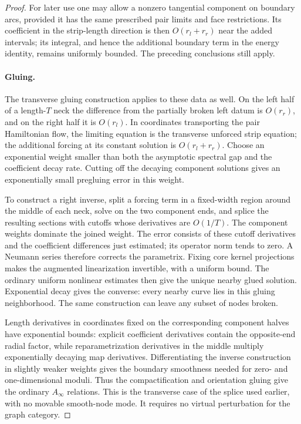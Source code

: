 \documentclass[11pt]{article}
\theoremstyle{definition}
\theoremstyle{remark}
\numberwithin{equation}{section}
\begin{document}
\begin{proof}
For later use one may allow a nonzero tangential component on boundary
arcs, provided it has the same prescribed pair limits and face
restrictions.  Its coefficient in the strip-length direction is then
\(O(r_l+r_r)\) near the added intervals; its integral, and hence the
additional boundary term in the energy identity, remains uniformly
bounded.  The preceding conclusions still apply.

\paragraph{Gluing.}
The transverse gluing construction applies to these data as well.
On the left half of a length-\(T\) neck the difference from the
partially broken left datum is \(O(r_r)\), and on the right half it is
\(O(r_l)\).  In coordinates transporting the pair Hamiltonian flow,
the limiting equation is the transverse unforced strip equation;
the additional forcing at its constant solution is
\(O(r_l+r_r)\).  Choose an exponential weight smaller than both the
asymptotic spectral gap and the coefficient decay rate.  Cutting off
the decaying component solutions gives an exponentially small
pregluing error in this weight.

To construct a right inverse, split a forcing term in a fixed-width
region around the middle of each neck, solve on the two component
ends, and splice the resulting sections with cutoffs whose derivatives
are \(O(1/T)\).  The component weights dominate the joined weight.
The error consists of these cutoff derivatives and the coefficient
differences just estimated; its operator norm tends to zero.
A Neumann series therefore corrects the parametrix.  Fixing core kernel
projections makes the augmented linearization invertible, with a
uniform bound.  The ordinary uniform nonlinear estimates then give
the unique nearby glued solution.  Exponential decay gives the
converse: every nearby curve lies in this gluing neighborhood.
The same construction can leave any subset of nodes broken.

Length derivatives in coordinates fixed on the corresponding
component halves have exponential bounds: explicit coefficient
derivatives contain the opposite-end radial factor, while
reparametrization derivatives in the middle multiply exponentially
decaying map derivatives.  Differentiating the inverse construction
in slightly weaker weights gives the boundary smoothness needed for
zero- and one-dimensional moduli.  Thus the compactification and
orientation gluing give the ordinary \(A_\infty\) relations.  This is the
transverse case of the splice used earlier, with no movable
smooth-node mode.  It requires no virtual perturbation for the graph
category.


\end{proof}
\end{document}
